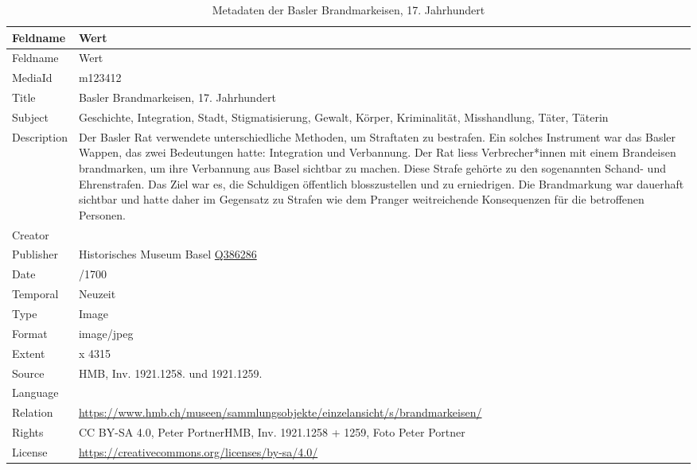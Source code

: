 \documentclass[
  nswissgerman,
  letterpaper,
  DIV=11,
  numbers=noendperiod]{scrartcl}
\begin{document}
\begin{longtable}[]{@{}
  >{\raggedright\arraybackslash}p{}
  >{\raggedright\arraybackslash}p{}@{}}
\caption{Metadaten der Basler Brandmarkeisen, 17.
Jahrhundert}\label{tbl-metadaten-basler-brandmarkeisen-17-jahrhundert}\tabularnewline
\toprule\noalign{}
\begin{minipage}[b]{\linewidth}\raggedright
Feldname
\end{minipage} & \begin{minipage}[b]{\linewidth}\raggedright
Wert
\end{minipage} \\
\midrule\noalign{}
\endfirsthead
\toprule\noalign{}
\begin{minipage}[b]{\linewidth}\raggedright
Feldname
\end{minipage} & \begin{minipage}[b]{\linewidth}\raggedright
Wert
\end{minipage} \\
\midrule\noalign{}
\endhead
\bottomrule\noalign{}
\endlastfoot
MediaId & m123412 \\
Title & Basler Brandmarkeisen, 17. Jahrhundert \\
Subject & Geschichte, Integration, Stadt, Stigmatisierung, Gewalt,
Körper, Kriminalität, Misshandlung, Täter, Täterin \\
Description & Der Basler Rat verwendete unterschiedliche Methoden, um
Straftaten zu bestrafen. Ein solches Instrument war das Basler Wappen,
das zwei Bedeutungen hatte: Integration und Verbannung. Der Rat liess
Verbrecher*innen mit einem Brandeisen brandmarken, um ihre Verbannung
aus Basel sichtbar zu machen. Diese Strafe gehörte zu den sogenannten
Schand- und Ehrenstrafen. Das Ziel war es, die Schuldigen öffentlich
blosszustellen und zu erniedrigen. Die Brandmarkung war dauerhaft
sichtbar und hatte daher im Gegensatz zu Strafen wie dem Pranger
weitreichende Konsequenzen für die betroffenen Personen. \\
Creator & \\
Publisher & Historisches Museum Basel
\href{http://www.wikidata.org/entity/Q386286}{Q386286} \\
Date & 1600/1700 \\
Temporal & Neuzeit \\
Type & Image \\
Format & image/jpeg \\
Extent & 3416 x 4315 \\
Source & HMB, Inv. 1921.1258. und 1921.1259. \\
Language & \\
Relation &
\url{https://www.hmb.ch/museen/sammlungsobjekte/einzelansicht/s/brandmarkeisen/} \\
Rights & CC BY-SA 4.0, Peter PortnerHMB, Inv. 1921.1258 + 1259, Foto
Peter Portner \\
License & \url{https://creativecommons.org/licenses/by-sa/4.0/} \\
\end{longtable}
\end{document}
